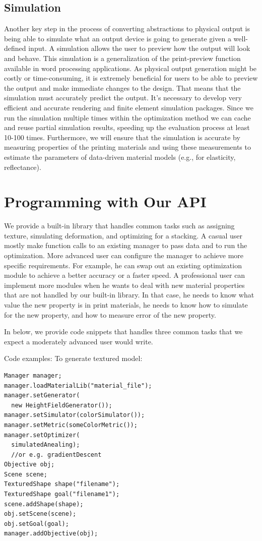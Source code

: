 \documentclass[annual]{acmsiggraph}
\begin{document}
\subsection{Simulation}
Another key step in the process of converting abstractions to physical output is being able to
simulate what an output device is going to generate given a well-defined input. 
A simulation allows the user to preview how the output will look and behave. 
This simulation is a generalization of the print-preview function
available in word processing applications.
As physical output generation might be costly or time-consuming, 
it is extremely beneficial for users to be able to preview the output and make immediate changes to the design.
That means that the simulation must accurately predict the output. 
It's necessary to develop very efficient and accurate rendering
and finite element simulation packages. Since we run the simulation multiple times within the optimization method
we can cache and reuse partial simulation results, speeding up the evaluation process at least 10-100 times.
Furthermore, we will ensure that the simulation is accurate by measuring properties of the printing materials and using
these measurements to estimate the parameters of data-driven material models (e.g., for elasticity, reflectance).
\section{Programming with Our API}
We provide a built-in library that handles common tasks such as assigning texture,
simulating deformation, and optimizing for a stacking.
A casual user mostly make function calls to an existing 
manager to pass data and to run the optimization.
More advanced user can configure the manager to achieve more specific requirements.
For example, he can swap out an existing optimization module to achieve a better accuracy or 
a faster speed.
A professional user can implement more modules when he wants to deal with new
material properties that are not handled by our built-in library. In that case,
he needs to know what value the new property is in print materials, he needs to know
how to simulate for the new property, and how to measure error of the new property.

In below, we provide code snippets that handles three common tasks
that we expect a moderately advanced user would write.

Code examples:
To generate textured model:
\begin{verbatim}
Manager manager;
manager.loadMaterialLib("material_file");
manager.setGenerator(
  new HeightFieldGenerator());
manager.setSimulator(colorSimulator());
manager.setMetric(someColorMetric());
manager.setOptimizer(
  simulatedAnealing);
  //or e.g. gradientDescent
Objective obj;
Scene scene;
TexturedShape shape("filename");
TexturedShape goal("filename1");
scene.addShape(shape);
obj.setScene(scene);
obj.setGoal(goal);
manager.addObjective(obj);
\end{verbatim}
\end{document}
